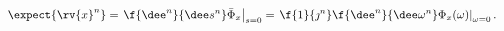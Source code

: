 \begin{mytheorem}
    \begin{align}
        \expect{\rv{x}^{n}} &= \left.\f{\dee^{n}}{\dee s^{n}}\bar{\Phi}_{x}\right|_{s=0} 
        = \left.\f{1}{\jmath^{n}}\f{\dee ^{n}}{\dee\omega^{n}}\Phi_{x}(\omega)\right|_{\omega=0}.
    \end{align}
\end{mytheorem}


    
    


    
